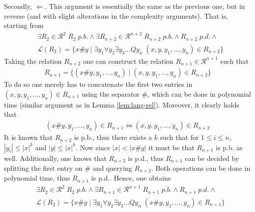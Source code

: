 \documentclass [11pt]{article}
\begin{document}
\begin{enumerate}
\medskip

Secondly, $\Leftarrow$.  This argument is essentially the same as the previous one, but in reverse (and with slight alterations in the complexity arguments). That is, starting from
 \begin{equation*}
\begin{split}
&\exists R_2 \in \mathcal{R}^{2} \; R_2 \; p.b.  \land  \exists R_{n+2}  \in  \mathcal{R}^{n+2} \; R_{n+2} \; p.b. \land R_{n+2} \; p.d. \land  \\
&\mathcal{L}(R_2) = \{x\#y \mid \exists y_1 \forall y_2\exists y_3\dots Q y_n  \; (x,y,y_1,\ldots,y_n) \in R_{n+2}\} 
\end{split}
\end{equation*}
Taking the relation $R_{n+2}$ one can construct the relation $R_{n+1} \in \mathcal{R}^{n+1}$ such that 
 \begin{equation*}
\begin{split}
 R_{n+1}=\{ (x\#y,y_1,\ldots,y_n) \mid (x,y,y_1,\ldots,y_n) \in R_{n+2}\} 
\end{split}
\end{equation*}
To do so one merely has to concatenate the first two entries in $(x,y,y_1,\ldots,y_n) \in R_{n+1}$ using the separator $\#$, which can be done in polynomial time (similar argument as in Lemma \ref{lem:lang-rel}). Moreover, it clearly holds that
 \begin{equation*}
\begin{split}
(x\#y,y_1,\ldots,y_n) \in R_{n+1} \iff   (x,y,y_1,\ldots,y_n) \in R_{n+2} 
\end{split}
\end{equation*}
It is known that $R_{n+2}$ is p.b., thus there exists a $k$ such that for $1 \leq i \leq n$, $|y_i| \leq |x|^k$ and $|y| \leq |x|^k$. Now since $|x| <|x\#y|$ it must be that $R_{n+1}$ is p.b. as well.
Additionally, one knows that $R_{n+2}$ is p.d., thus $R_{n+1}$ can be decided by splitting the first entry on $\#$ and querying $R_{n+2}$. Both operations can be done in polynomial time, thus $R_{n+1}$ is p.d..
Hence, one obtains 
 \begin{equation*}
\begin{split}
&\exists R_2 \in \mathcal{R}^{2} \; R_2 \; p.b.  \land  \exists R_{n+1}  \in  \mathcal{R}^{n+1} \; R_{n+1} \; p.b. \land R_{n+1} \; p.d. \land  \\
&\mathcal{L}(R_2) = \{x\#y \mid \exists y_1 \forall y_2\exists y_3\dots Q y_n  \; (x\#y,y_1,\ldots,y_n) \in R_{n+1}\} 
\end{split}
\end{equation*}



\end{enumerate}
\end{document}
